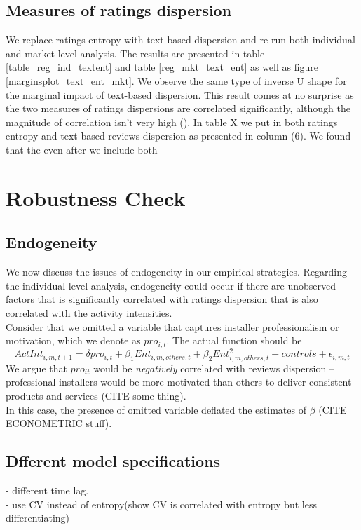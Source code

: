 \documentclass[msom,blindrev]{informs3}
\begin{document}
\subsection{Measures of ratings dispersion}
We replace ratings entropy with text-based dispersion and re-run both individual and market level analysis. The results are presented in table \ref{table_reg_ind_textent} and table \ref{reg_mkt_text_ent} as well as figure \ref{marginsplot_text_ent_mkt}. We observe the same type of inverse U shape for the marginal impact of text-based dispersion. This result comes at no surprise as the two measures of ratings dispersions are correlated significantly, although the magnitude of correlation isn't very high (). In table X we put in both ratings entropy and text-based reviews dispersion as presented in column (6). We found that the even after we include both  \\



\section{Robustness Check}
\subsection{Endogeneity}
We now discuss the issues of endogeneity in our empirical strategies. Regarding the individual level analysis, endogeneity could occur if there are unobserved factors that is significantly correlated with ratings dispersion that is also correlated with the activity intensities.\\
Consider that we omitted a variable that captures installer professionalism or motivation, which we denote as $pro_{i,t}$. The actual function should be
\begin{equation}
ActInt_{i,m,t+1}=\delta pro_{i,t}+\beta_{1} Ent_{i,m,others,t}+\beta_{2}Ent_{i,m,others,t}^2+controls+\epsilon_{i,m,t}
\end{equation}
We argue that $pro_{it}$ would be \textit{negatively} correlated with reviews dispersion -- professional installers would be more motivated than others to deliver consistent products and services (CITE some thing).  \\

In this case, the presence of omitted variable deflated the estimates of $\beta$ (CITE ECONOMETRIC stuff). \\
\subsection{Dfferent model specifications}
- different time lag.  \\
- use CV instead of entropy(show CV is correlated with entropy but less differentiating) \\
\end{document}
